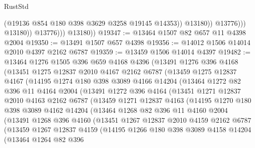 \begin{lexlean}{RustStd}
\begin{coremodule}
{\begin{coremodule}
{{{{{{{{{{{{{{{{{{{{{{{{{{{{{{{                              (@19136 @854 @180 @398 @3629 @3258 @19145 @14353))
                            @13180))
                        @13776)))
                  @13180))
              @13776)))
        @13180))
@19347 := @13464 @1507 @82 @657 @11 @4398 @2004
@19350 := @13491 @1507 @657 @4398
@19356 := @14012 @1506 @14014 @2010 @4397 @2162 @6787
@19359 := @13459 @1506 @14014 @4397
@19482 := @13464
    @1276
    @1505
    @396
    @659
    @4168
    @4396
    (@13491
      @1276
      @396
      @4168
      (@13451
        @1275
        @12837
        @2010
        @4167
        @2162
        @6787
        (@13459
          @1275
          @12837
          @4167
          (@14195
            @1274
            @180
            @398
            @3089
            @4166
            @14204
            (@13464
              @1272
              @82
              @396
              @11
              @4164
              @2004
              (@13491
                @1272
                @396
                @4164
                (@13451
                  @1271
                  @12837
                  @2010
                  @4163
                  @2162
                  @6787
                  (@13459
                    @1271
                    @12837
                    @4163
                    (@14195
                      @1270
                      @180
                      @398
                      @3089
                      @4162
                      @14204
                      (@13464
                        @1268
                        @82
                        @396
                        @11
                        @4160
                        @2004
                        (@13491
                          @1268
                          @396
                          @4160
                          (@13451
                            @1267
                            @12837
                            @2010
                            @4159
                            @2162
                            @6787
                            (@13459
                              @1267
                              @12837
                              @4159
                              (@14195
                                @1266
                                @180
                                @398
                                @3089
                                @4158
                                @14204
                                (@13464
                                  @1264
                                  @82
                                  @396
}}}}}}}}}}}}}}}}}}}}}}}}}}}}}}}
\end{coremodule}}
\end{coremodule}
\end{lexlean}
